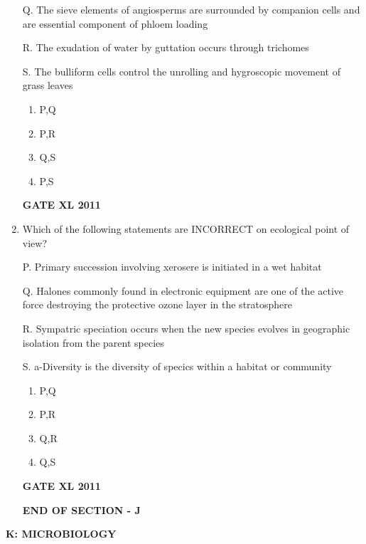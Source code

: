 \documentclass[journal,12pt,onecolumn]{IEEEtran}
\begin{document}
\begin{enumerate}
{Q. The sieve elements of angiosperms are surrounded by companion cells and are essential component of phloem loading

R. The exudation of water by guttation occurs through trichomes

S. The bulliform cells control the unrolling and hygroscopic movement of grass leaves}

		\begin{enumerate}
			\item P,Q
			\item P,R
			\item Q,S
			\item P,S
		\end{enumerate}
		\hfill{\textbf{GATE XL 2011}}

\item {Which of the following statements are INCORRECT on ecological point of view?

P. Primary succession involving xerosere is initiated in a wet habitat

Q. Halones commonly found in electronic equipment are one of the active force destroying the protective ozone layer in the stratosphere

R. Sympatric speciation occurs when the new species evolves in geographic isolation from the parent species

S. a-Diversity is the diversity of specics within a habitat or community
}
		\begin{enumerate}
			\item P,Q
			\item P,R
			\item Q,R
			\item Q,S
		\end{enumerate}
\hfill{\textbf{GATE XL 2011}}



\textbf{END OF SECTION - J}
\end{enumerate}
\newpage
\textbf{K: MICROBIOLOGY}
\end{document}
